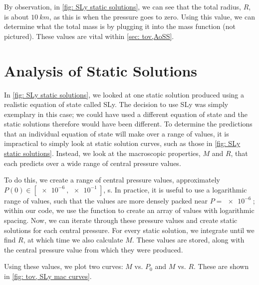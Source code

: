 By observation, in \autoref{fig: SLy static solutions}, we can see that the total radius, $R$, is about $\SI{10}{km}$, as this is when the pressure goes to zero. Using this value, we can determine what the total mass is by plugging it into the mass function (not pictured). These values are vital within \autoref{sec: tov,AoSS}.

\section{Analysis of Static Solutions}\label{sec: tov,AoSS}


In \autoref{fig: SLy static solutions}, we looked at one static solution produced using a realistic equation of state called SLy. The decision to use SLy was simply exemplary in this case; we could have used a different equation of state and the static solutions therefore would have been different. To determine the predictions that an individual equation of state will make over a range of values, it is impractical to simply look at static solution curves, such as those in \autoref{fig: SLy static solutions}. Instead, we look at the macroscopic properties, $M$ and $R$, that each predicts over a wide range of central pressure values.

To do this, we create a range of central pressure values, approximately $P(0)\in [\SI{e-6}{}, \SI{e-1}{}]$, s. In practice, it is useful to use a logarithmic range of values, such that the values are more densely packed near $P=\SI{e-6}{}$; within our code, we use the  function  to create an array of values with logarithmic spacing. Now, we can iterate through these pressure values and create static solutions for each central pressure. For every static solution, we integrate until we find $R$, at which time we also calculate $M$. These values are stored, along with the central pressure value from which they were produced.

Using these values, we plot two curves: $M$ vs. $P_0$ and $M$ vs. $R$. These are shown in \autoref{fig: tov, SLy mac curves}.

